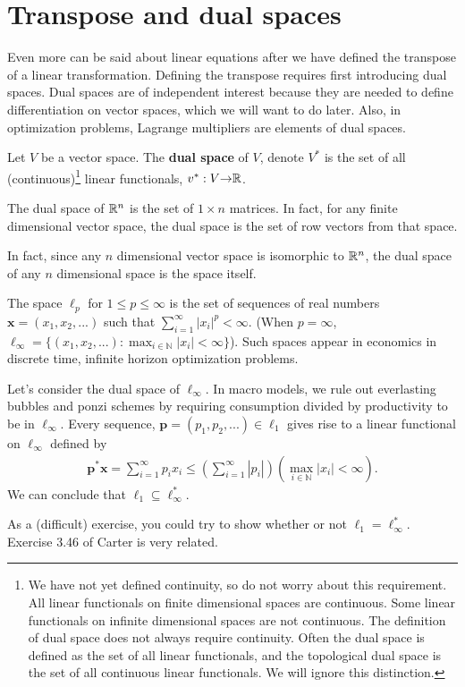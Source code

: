 \section{Transpose and dual spaces}

Even more can be said about linear equations after we have defined the
transpose of a linear transformation.  Defining the transpose requires
first introducing dual spaces. Dual spaces are of independent interest
because they are needed to define differentiation on vector spaces,
which we will want to do later. Also, in optimization problems, Lagrange
multipliers are elements of dual spaces. 
\begin{definition}
  Let $V$ be a vector space. The \textbf{dual space} of $V$, denote
  $V^\ast$ is the set of all (continuous)\footnote{We have not yet
    defined continuity, so do not worry about this requirement. All
    linear functionals on finite dimensional spaces are
    continuous. Some linear functionals on infinite dimensional spaces
    are not continuous. The definition of dual space does not always
    require continuity. Often the dual space is defined as the set of
    all linear functionals, and the topological dual space is the set
    of all continuous linear functionals. We will ignore this
    distinction.}  linear functionals, $v^\ast: V {\rightarrow} \mathbb{R}$.
\end{definition}

\begin{example}
  The dual space of $\mathbb{R}^n$ is the set of $1 \times n$ matrices. In
  fact, for any finite dimensional vector space, the dual space is the
  set of row vectors from that space. 
\end{example}
In fact, since any $n$ dimensional vector space is isomorphic to
$\mathbb{R}^n$, the dual space of any $n$ dimensional space is the space itself. 

\begin{example}
  The space $\ell_p$ for $1 \leq p \leq \infty$ is the set of
  sequences of real numbers $\mathbf{x}=(x_1, x_2, ...)$ such that
  $\sum_{i=1}^\infty |x_i|^p < \infty$. (When $p = \infty$, $\ell_\infty = \{ 
  (x_1, x_2, ...) : \max_{i \in \mathbb{N}} |x_i| < \infty \}$). Such
  spaces appear in economics in discrete time, infinite horizon
  optimization problems. 

  Let's consider the dual space of $\ell_\infty$. In macro models, we
  rule out everlasting bubbles and ponzi schemes by requiring
  consumption divided by productivity to be in $\ell_\infty$. Every
  sequence, $\mathbf{p} = (p_1, p_2, ...) \in \ell_1$ gives rise to a linear
  functional on $\ell_\infty$ defined by
  \begin{align*}
    \mathbf{p}^\ast \mathbf{x} = \sum_{i=1}^\infty p_i x_i \leq
    \left(\sum_{i=1}^\infty |p_i| \right) \left(\max_{i \in
        \mathbb{N}} |x_i| < \infty\right). 
  \end{align*}
  We can conclude that $\ell_1 \subseteq \ell_\infty^\ast$. 

  As a (difficult) exercise, you could try to show whether or not
  $\ell_1 = \ell_\infty^\ast$. Exercise 3.46 of Carter is very
  related. 
\end{example}

